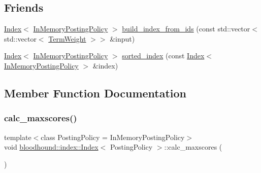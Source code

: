 \subsection*{Friends}
\begin{DoxyCompactItemize}
\item 
\hyperlink{classbloodhound_1_1index_1_1Index}{Index}$<$ \hyperlink{classbloodhound_1_1index_1_1InMemoryPostingPolicy}{In\+Memory\+Posting\+Policy} $>$ \hyperlink{classbloodhound_1_1index_1_1Index_a0343a97c005a2df437a955c308d376e6}{build\+\_\+index\+\_\+from\+\_\+ids} (const std\+::vector$<$ std\+::vector$<$ \hyperlink{structbloodhound_1_1TermWeight}{Term\+Weight} $>$$>$ \&input)
\item 
\hyperlink{classbloodhound_1_1index_1_1Index}{Index}$<$ \hyperlink{classbloodhound_1_1index_1_1InMemoryPostingPolicy}{In\+Memory\+Posting\+Policy} $>$ \hyperlink{classbloodhound_1_1index_1_1Index_aad81f0929f0b03479f3361a23d96573b}{sorted\+\_\+index} (const \hyperlink{classbloodhound_1_1index_1_1Index}{Index}$<$ \hyperlink{classbloodhound_1_1index_1_1InMemoryPostingPolicy}{In\+Memory\+Posting\+Policy} $>$ \&index)
\end{DoxyCompactItemize}


\subsection{Member Function Documentation}
\mbox{\label{classbloodhound_1_1index_1_1Index_a00eb8ae8cf8f24430fe170095c4aa4d9}} 
\subsubsection{\texorpdfstring{calc\+\_\+maxscores()}{calc\_maxscores()}}
{\footnotesize\ttfamily template$<$class Posting\+Policy = In\+Memory\+Posting\+Policy$>$ \\
void \hyperlink{classbloodhound_1_1index_1_1Index}{bloodhound\+::index\+::\+Index}$<$ Posting\+Policy $>$\+::calc\+\_\+maxscores (\begin{DoxyParamCaption}{ }\end{DoxyParamCaption})\hspace{0.3cm}{\ttfamily [inline]}}

\mbox{\label{classbloodhound_1_1index_1_1Index_aead1eb965d1607d25398b874cbd8a269}} 
